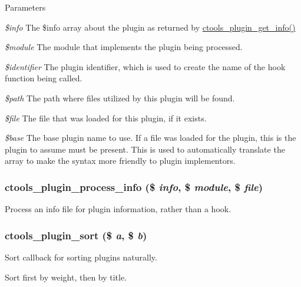 \begin{DoxyParams}{Parameters}
\item[{\em \$info}]The \$info array about the plugin as returned by \hyperlink{ctools_2includes_2plugins_8inc_addf3f6a3107a10cf5fb701420a9f8dcb}{ctools\_\-plugin\_\-get\_\-info()} \item[{\em \$module}]The module that implements the plugin being processed. \item[{\em \$identifier}]The plugin identifier, which is used to create the name of the hook function being called. \item[{\em \$path}]The path where files utilized by this plugin will be found. \item[{\em \$file}]The file that was loaded for this plugin, if it exists. \item[{\em \$base}]The base plugin name to use. If a file was loaded for the plugin, this is the plugin to assume must be present. This is used to automatically translate the array to make the syntax more friendly to plugin implementors. \end{DoxyParams}
\hypertarget{ctools_2includes_2plugins_8inc_a2f5e8eee53eebcb762bcbc5f30bc7b87}{
\subsubsection[{ctools\_\-plugin\_\-process\_\-info}]{\setlength{\rightskip}{0pt plus 5cm}ctools\_\-plugin\_\-process\_\-info (\$ {\em info}, \/  \$ {\em module}, \/  \$ {\em file})}}
\label{ctools_2includes_2plugins_8inc_a2f5e8eee53eebcb762bcbc5f30bc7b87}
Process an info file for plugin information, rather than a hook. \hypertarget{ctools_2includes_2plugins_8inc_a02dbd74afeac1df5f1a6533555137a18}{
\subsubsection[{ctools\_\-plugin\_\-sort}]{\setlength{\rightskip}{0pt plus 5cm}ctools\_\-plugin\_\-sort (\$ {\em a}, \/  \$ {\em b})}}
\label{ctools_2includes_2plugins_8inc_a02dbd74afeac1df5f1a6533555137a18}
Sort callback for sorting plugins naturally.

Sort first by weight, then by title. 